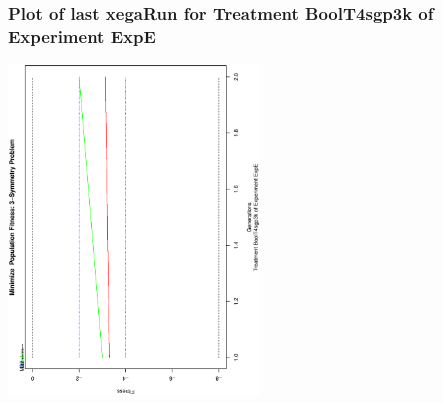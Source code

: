  \begin{frame}
 \frametitle{ Plot of last xegaRun for Treatment BoolT4sgp3k of Experiment ExpE }
 \begin{center}
\includegraphics[width=0.5\textwidth, angle=-90]
{ExpEPlotPopStatsFigure001.eps}
 \end{center}
 \label{report/ExpEPlotPopStatsFigure001.eps}  
 \end{frame}

